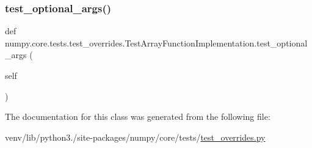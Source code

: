 \subsubsection{\texorpdfstring{test\+\_\+optional\+\_\+args()}{test\_optional\_args()}}
{\footnotesize\ttfamily def numpy.\+core.\+tests.\+test\+\_\+overrides.\+Test\+Array\+Function\+Implementation.\+test\+\_\+optional\+\_\+args (\begin{DoxyParamCaption}\item[{}]{self }\end{DoxyParamCaption})}



The documentation for this class was generated from the following file\+:\begin{DoxyCompactItemize}
\item 
venv/lib/python3./site-\/packages/numpy/core/tests/\hyperlink{test__overrides_8py}{test\+\_\+overrides.\+py}\end{DoxyCompactItemize}
